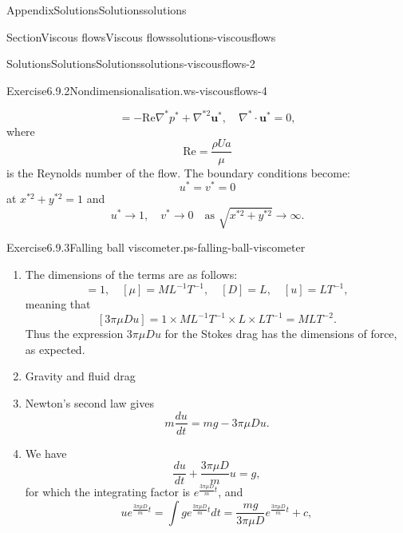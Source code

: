 \documentclass[oneside,10pt,]{book}
\numberwithin{equation}{section}
\newcommand{\bu}{\boldsymbol{u}}
\begin{document}
\begin{appendixptx}{Appendix}{Solutions}{}{Solutions}{}{}{solutions}
\begin{sectionptx}{Section}{Viscous flows}{}{Viscous flows}{}{}{solutions-viscousflows}
\begin{solutions-subsection-numberless}{Solutions}{Solutions}{}{Solutions}{}{}{solutions-viscousflows-2}
\begin{divisionsolution}{Exercise}{6.9.2}{Nondimensionalisation.}{ws-viscousflows-4}
\begin{enumerate}[font=\bfseries,label=(\alph*),ref=\alph*]
\begin{equation*}
=-\mathrm{Re}\nabla^*p^*
+\nabla^{*2}\bu^*,\quad
\nabla^*\cdot\bu^*=0,
\end{equation*}
where%
\begin{equation*}
\mathrm{Re}=\frac{\rho Ua}{\mu}
\end{equation*}
is the Reynolds number of the flow. The boundary conditions become:%
\begin{equation*}
u^*=v^*=0
\end{equation*}
at \(x^{*2}+y^{*2}=1\) and%
\begin{equation*}
u^*\rightarrow 1,\quad v^*\rightarrow0\quad\textrm{as }\sqrt{x^{*2}+y^{*2}}\rightarrow\infty.
\end{equation*}
%
\end{enumerate}%
\end{divisionsolution}%
\begin{divisionsolution}{Exercise}{6.9.3}{Falling ball viscometer.}{ps-falling-ball-viscometer}%
\begin{enumerate}[font=\bfseries,label=(\alph*),ref=\alph*]%
\item[(a)]\noindent\hypertarget{ps-falling-ball-viscometer-3-2-main}{}The dimensions of the terms are as follows:%
\begin{equation*}
[3\pi]=1,\quad
[\mu]=ML^{-1}T^{-1},\quad
[D]=L,\quad
[u]=LT^{-1},
\end{equation*}
meaning that%
\begin{equation*}
\left[3\pi\mu Du\right]=1\times ML^{-1}T^{-1}\times L\times LT^{-1}
=MLT^{-2}.
\end{equation*}
Thus the expression \(3\pi\mu Du\) for the Stokes drag has the dimensions of force, as expected.%
\item[(b)]\noindent\hypertarget{ps-falling-ball-viscometer-4-2-main}{}Gravity and fluid drag%
\item[(c)]\noindent\hypertarget{ps-falling-ball-viscometer-5-2-main}{}Newton's second law gives%
\begin{equation*}
m\frac{du}{dt}=mg-3\pi\mu Du.
\end{equation*}
%
\item[(d)]\noindent\hypertarget{ps-falling-ball-viscometer-6-2-main}{}We have%
\begin{equation*}
\frac{du}{dt}+\frac{3\pi\mu D}{m}u=g,
\end{equation*}
for which the integrating factor is \(e^{\frac{3\pi\mu D}{m}t}\), and%
\begin{equation*}
ue^{\frac{3\pi\mu D}{m}t}=\int ge^{\frac{3\pi\mu D}{m}t}dt
=\frac{mg}{3\pi\mu D}e^{\frac{3\pi\mu D}{m}t}+c,

\end{equation*}
\end{enumerate}
\end{divisionsolution}
\end{solutions-subsection-numberless}
\end{sectionptx}
\end{appendixptx}
\end{document}
